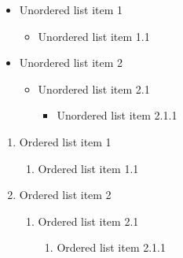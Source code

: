 
\begin{itemize}


\item Unordered list item 1



\begin{itemize}


\item Unordered list item 1.1


\end{itemize}
\item Unordered list item 2



\begin{itemize}


\item Unordered list item 2.1



\begin{itemize}


\item Unordered list item 2.1.1


\end{itemize}

\end{itemize}

\end{itemize}




\begin{enumerate}


\item Ordered list item 1



\begin{enumerate}


\item Ordered list item 1.1


\end{enumerate}
\item Ordered list item 2



\begin{enumerate}


\item Ordered list item 2.1



\begin{enumerate}


\item Ordered list item 2.1.1


\end{enumerate}

\end{enumerate}

\end{enumerate}


